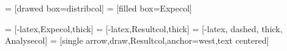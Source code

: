 


 = [drawed box=distribcol]
 = [filled box=Expecol]

  = [-latex,Expecol,thick]
 = [-latex,Resultcol,thick]
 = [-latex, dashed, thick, Analysecol]
 = [single arrow,draw,Resultcol,anchor=west,text centered]


